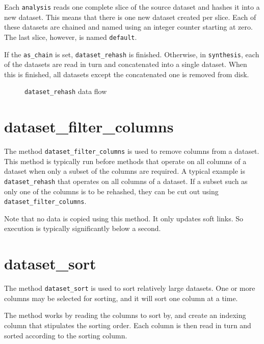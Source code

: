 Each \texttt{analysis} reads one complete slice of the source dataset
and hashes it into a new dataset.  This means that there is one new
dataset created per slice.  Each of these datasets are chained and
named using an integer counter starting at zero.  The last slice,
however, is named \texttt{default}.

If the \texttt{as\_chain} is set, \texttt{dataset\_rehash} is finished.
Otherwise, in \texttt{synthesis}, each of the datasets are read in
turn and concatenated into a single dataset.  When this is finished,
all datasets except the concatenated one is removed from disk.


\begin{figure}[h!]
  \begin{center}
    
  \end{center}
  \caption{\texttt{dataset\_rehash} data flow}
  \label{fig:dataset_rehash}
\end{figure}


\clearpage
\section{dataset\_filter\_columns}
The method \texttt{dataset\_filter\_columns} is used to remove columns
from a dataset.  This method is typically run before methods that
operate on all columns of a dataset when only a subset of the columns
are required.  A typical example is \texttt{dataset\_rehash} that
operates on all columns of a dataset.  If a subset such as only one of
the columns is to be rehashed, they can be cut out using
\texttt{dataset\_filter\_columns}.

Note that no data is copied using this method.  It only updates soft
links.  So execution is typically significantly below a second.





\clearpage
\section{dataset\_sort}
The method \texttt{dataset\_sort} is used to sort relatively large
datasets.  One or more columns may be selected for sorting, and it
will sort one column at a time.

The method works by reading the columns to sort by, and create an
indexing column that stipulates the sorting order.  Each column is
then read in turn and sorted according to the sorting column.

